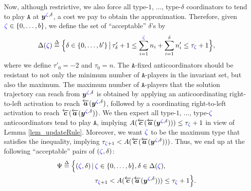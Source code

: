 \documentclass[10 pt,twocolumn,journal]{IEEEtran}
\theoremstyle{plain}
\newcommand{\db}{\overset{\Delta}{=}}
\newcommand{\A}{\mathcal{A}}
\newcommand{\y}{\bm{y}}
\renewcommand{\a}{\bm{a}}
\renewcommand{\c}{\bm{c}}
\renewcommand{\r}{\tb{\zeta}}
\renewcommand{\d}{{\delta}}
\renewcommand{\A}{\mathtt{A}}
\newcommand{\tb}{\textcolor{blue}}
\theoremstyle{definition}
\begin{document}
Now, although restrictive, we also force all type-$1$, ..., type-$\d$ coordinators to tend to play $\A$ at $\y^{\r,\d}$, a cost we pay to obtain the approximation.
Therefore, given $\r\in\{0,\ldots,b\}$, we define the set of ``acceptable'' $\delta$'s by 
\begin{equation*}
    \Delta(\r) \db
    \Big\{\d\in\{0,\ldots,b'\}\,\big|\, 
    \tau'_{\d}+1 \leq
        \sum_{i=1}^{\r} n_i + \sum_{i=1}^{\d} n'_i 
            \leq \tau_{\r}+1 \Big\},
\end{equation*}
where we define $\tau'_0=-2$ and $\tau_{0}=n$.
The $\A$-fixed anticoordinators should be resistant to not only the minimum number of $\A$-players in the invariant set, but also the maximum. 
The maximum number of $\A$-players that the solution trajectory can reach from $\y^{\r,\d}$ is obtained by applying
an anticoordinating right-to-left activation to reach $\overleftarrow{\a}(\y^{\r,\d})$, followed by a coordinating right-to-left activation to reach $ \overleftarrow{\c}(\overleftarrow{\a}(\y^{\r,\d}))$.
We then expect all type-$1$, ..., type-$\r$ anticoordinators tend to play $\A$, implying $A(\overleftarrow{\c}(\overleftarrow{\a}(\y^{\r,\d}))) \leq {\tau_{\r}}+1$ in view of Lemma \ref{lem_updateRule}.
Moreover, we want $\r$ to be the maximum type that satisfies the inequality, implying $\tau_{\r+1} < A(\overleftarrow{\c}(\overleftarrow{\a}(\y^{\r,\d})))$.
Thus, we end up at the following ``acceptable'' pairs of $(\r,\d)$:
\begin{align}
    \Psi \db 
    \Big\{(\r,\d) \,|\, &\r\in\{0,\ldots,b\}, \d\in\Delta(\r), \nonumber\\
    & {\tau_{\r+1}} < A(\overleftarrow{\c}(\overleftarrow{\a}(\y^{\r,\d}))) \leq {\tau_{\r}} + 1\Big\}. \label{th1_def1}
\end{align}
\end{document}
